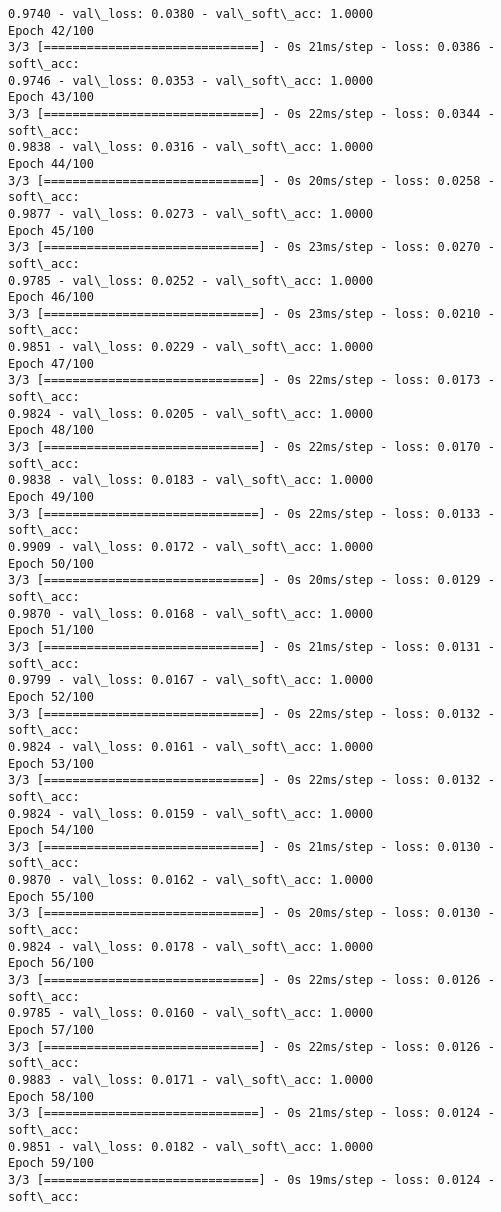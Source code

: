 \documentclass[11pt]{article}
\begin{document}
\begin{Verbatim}[commandchars=\\\{\}]
0.9740 - val\_loss: 0.0380 - val\_soft\_acc: 1.0000
Epoch 42/100
3/3 [==============================] - 0s 21ms/step - loss: 0.0386 - soft\_acc:
0.9746 - val\_loss: 0.0353 - val\_soft\_acc: 1.0000
Epoch 43/100
3/3 [==============================] - 0s 22ms/step - loss: 0.0344 - soft\_acc:
0.9838 - val\_loss: 0.0316 - val\_soft\_acc: 1.0000
Epoch 44/100
3/3 [==============================] - 0s 20ms/step - loss: 0.0258 - soft\_acc:
0.9877 - val\_loss: 0.0273 - val\_soft\_acc: 1.0000
Epoch 45/100
3/3 [==============================] - 0s 23ms/step - loss: 0.0270 - soft\_acc:
0.9785 - val\_loss: 0.0252 - val\_soft\_acc: 1.0000
Epoch 46/100
3/3 [==============================] - 0s 23ms/step - loss: 0.0210 - soft\_acc:
0.9851 - val\_loss: 0.0229 - val\_soft\_acc: 1.0000
Epoch 47/100
3/3 [==============================] - 0s 22ms/step - loss: 0.0173 - soft\_acc:
0.9824 - val\_loss: 0.0205 - val\_soft\_acc: 1.0000
Epoch 48/100
3/3 [==============================] - 0s 22ms/step - loss: 0.0170 - soft\_acc:
0.9838 - val\_loss: 0.0183 - val\_soft\_acc: 1.0000
Epoch 49/100
3/3 [==============================] - 0s 22ms/step - loss: 0.0133 - soft\_acc:
0.9909 - val\_loss: 0.0172 - val\_soft\_acc: 1.0000
Epoch 50/100
3/3 [==============================] - 0s 20ms/step - loss: 0.0129 - soft\_acc:
0.9870 - val\_loss: 0.0168 - val\_soft\_acc: 1.0000
Epoch 51/100
3/3 [==============================] - 0s 21ms/step - loss: 0.0131 - soft\_acc:
0.9799 - val\_loss: 0.0167 - val\_soft\_acc: 1.0000
Epoch 52/100
3/3 [==============================] - 0s 22ms/step - loss: 0.0132 - soft\_acc:
0.9824 - val\_loss: 0.0161 - val\_soft\_acc: 1.0000
Epoch 53/100
3/3 [==============================] - 0s 22ms/step - loss: 0.0132 - soft\_acc:
0.9824 - val\_loss: 0.0159 - val\_soft\_acc: 1.0000
Epoch 54/100
3/3 [==============================] - 0s 21ms/step - loss: 0.0130 - soft\_acc:
0.9870 - val\_loss: 0.0162 - val\_soft\_acc: 1.0000
Epoch 55/100
3/3 [==============================] - 0s 20ms/step - loss: 0.0130 - soft\_acc:
0.9824 - val\_loss: 0.0178 - val\_soft\_acc: 1.0000
Epoch 56/100
3/3 [==============================] - 0s 22ms/step - loss: 0.0126 - soft\_acc:
0.9785 - val\_loss: 0.0160 - val\_soft\_acc: 1.0000
Epoch 57/100
3/3 [==============================] - 0s 22ms/step - loss: 0.0126 - soft\_acc:
0.9883 - val\_loss: 0.0171 - val\_soft\_acc: 1.0000
Epoch 58/100
3/3 [==============================] - 0s 21ms/step - loss: 0.0124 - soft\_acc:
0.9851 - val\_loss: 0.0182 - val\_soft\_acc: 1.0000
Epoch 59/100
3/3 [==============================] - 0s 19ms/step - loss: 0.0124 - soft\_acc:

\end{Verbatim}
\end{document}
